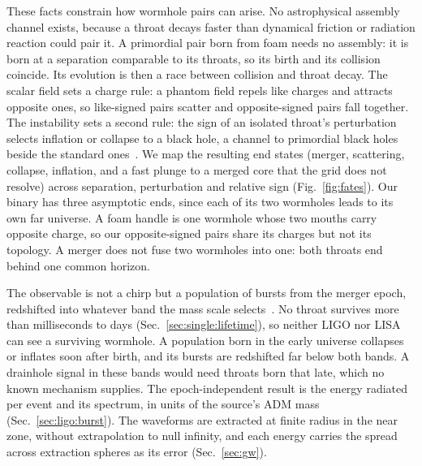 \documentclass[twocolumn,floatfix,aps,prd,superscriptaddress,nofootinbib]{revtex4-2}
\begin{document}
These facts constrain how wormhole pairs can arise. No astrophysical assembly channel exists, because a throat decays faster than dynamical friction or radiation reaction could pair it. A primordial pair born from foam needs no assembly: it is born at a separation comparable to its throats, so its birth and its collision coincide. Its evolution is then a race between collision and throat decay. The scalar field sets a charge rule: a phantom field repels like charges and attracts opposite ones, so like-signed pairs scatter and opposite-signed pairs fall together. The instability sets a second rule: the sign of an isolated throat's perturbation selects inflation or collapse to a black hole, a channel to primordial black holes beside the standard ones~\cite{zeldovich1967,carr_hawking1974,carr2021}. We map the resulting end states (merger, scattering, collapse, inflation, and a fast plunge to a merged core that the grid does not resolve) across separation, perturbation and relative sign (Fig.~\ref{fig:fates}). Our binary has three asymptotic ends, since each of its two wormholes leads to its own far universe. A foam handle is one wormhole whose two mouths carry opposite charge, so our opposite-signed pairs share its charges but not its topology. A merger does not fuse two wormholes into one: both throats end behind one common horizon.

The observable is not a chirp but a population of bursts from the merger epoch, redshifted into whatever band the mass scale selects~\cite{caprini2018,nanograv2023,lisa2017,lvk2021}. No throat survives more than milliseconds to days (Sec.~\ref{sec:single:lifetime}), so neither LIGO nor LISA~\cite{aligo2010,robson2019,thrane2013} can see a surviving wormhole. A population born in the early universe collapses or inflates soon after birth, and its bursts are redshifted far below both bands. A drainhole signal in these bands would need throats born that late, which no known mechanism supplies. The epoch-independent result is the energy radiated per event and its spectrum, in units of the source's ADM mass (Sec.~\ref{sec:ligo:burst}). The waveforms are extracted at finite radius in the near zone, without extrapolation to null infinity, and each energy carries the spread across extraction spheres as its error (Sec.~\ref{sec:gw}).
\end{document}
